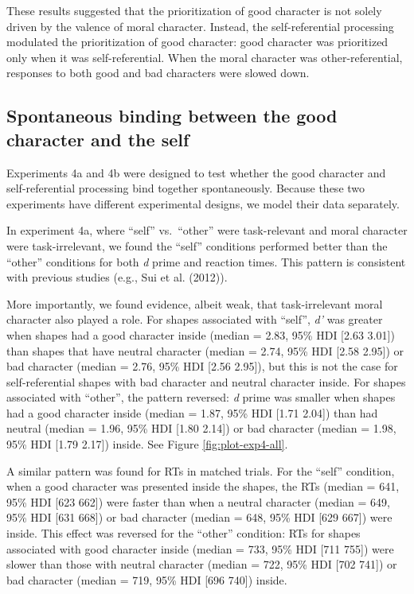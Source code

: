 \documentclass[
  man]{apa6}
\begin{document}
These results suggested that the prioritization of good character is not solely driven by the valence of moral character. Instead, the self-referential processing modulated the prioritization of good character: good character was prioritized only when it was self-referential. When the moral character was other-referential, responses to both good and bad characters were slowed down.

\hypertarget{spontaneous-binding-between-the-good-character-and-the-self}{%
\subsection{Spontaneous binding between the good character and the self}\label{spontaneous-binding-between-the-good-character-and-the-self}}

Experiments 4a and 4b were designed to test whether the good character and self-referential processing bind together spontaneously. Because these two experiments have different experimental designs, we model their data separately.

In experiment 4a, where ``self'' vs.~``other'' were task-relevant and moral character were task-irrelevant, we found the ``self'' conditions performed better than the ``other'' conditions for both \emph{d} prime and reaction times. This pattern is consistent with previous studies (e.g., Sui et al. (2012)).

More importantly, we found evidence, albeit weak, that task-irrelevant moral character also played a role. For shapes associated with ``self'', \emph{d'} was greater when shapes had a good character inside (median = 2.83, 95\% HDI {[}2.63 3.01{]}) than shapes that have neutral character (median = 2.74, 95\% HDI {[}2.58 2.95{]}) or bad character (median = 2.76, 95\% HDI {[}2.56 2.95{]}), but this is not the case for self-referential shapes with bad character and neutral character inside. For shapes associated with ``other'', the pattern reversed: \emph{d} prime was smaller when shapes had a good character inside (median = 1.87, 95\% HDI {[}1.71 2.04{]}) than had neutral (median = 1.96, 95\% HDI {[}1.80 2.14{]}) or bad character (median = 1.98, 95\% HDI {[}1.79 2.17{]}) inside. See Figure \ref{fig:plot-exp4-all}.

A similar pattern was found for RTs in matched trials. For the ``self'' condition, when a good character was presented inside the shapes, the RTs (median = 641, 95\% HDI {[}623 662{]}) were faster than when a neutral character (median = 649, 95\% HDI {[}631 668{]}) or bad character (median = 648, 95\% HDI {[}629 667{]}) were inside. This effect was reversed for the ``other'' condition: RTs for shapes associated with good character inside (median = 733, 95\% HDI {[}711 755{]}) were slower than those with neutral character (median = 722, 95\% HDI {[}702 741{]}) or bad character (median = 719, 95\% HDI {[}696 740{]}) inside.
\end{document}
